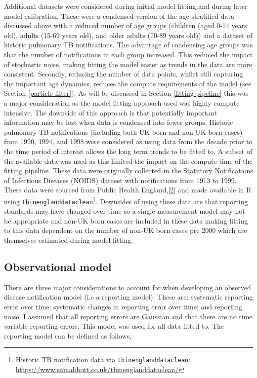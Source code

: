 \documentclass[11pt,twoside]{bristolthesis}
\begin{document}
  Additional datasets were considered during initial model fitting and during later model calibration. These were a condensed version of the age stratified data discussed above with a reduced number of age groups (children (aged 0-14 years old), adults (15-69 years old), and older adults (70-89 years old)) and a dataset of historic pulmonary TB notifications. The advantage of condensing age groups was that the number of notifications in each group increased. This reduced the impact of stochastic noise, making fitting the model easier as trends in the data are more consistent. Secondly, reducing the number of data points, whilst still capturing the important age dynamics, reduces the compute requirements of the model (see Section \ref{particle-filter}). As will be discussed in Section \ref{fitting-pipeline} this was a major consideration as the model fitting approach used was highly compute intensive. The downside of this approach is that potentially important information may be lost when data is condensed into fewer groups. Historic pulmonary TB notifications (including both UK born and non-UK born cases) from 1990, 1994, and 1998 were considered as using data from the decade prior to the time period of interest allows the long term trends to be fitted to. A subset of the available data was used as this limited the impact on the compute time of the fitting pipeline. These data were originally collected in the Statutory Notifications of Infectious Diseases (NOIDS) dataset with notifications from 1913 to 1999. These data were sourced from Public Health England,{[}\protect\hyperlink{ref-PHE2017}{2}{]} and made available in R using \texttt{tbinenglanddataclean}\footnote{Historic TB notification data via \texttt{tbinenglanddataclean}: \url{https://www.samabbott.co.uk/tbinenglanddataclean/}}. Downsides of using these data are that reporting standards may have changed over time so a single measurement model may not be appropriate and non-UK born cases are included in these data making fitting to this data dependent on the number of non-UK born cases pre 2000 which are themselves estimated during model fitting.
  
  \hypertarget{observational-model}{%
  \subsection{Observational model}\label{observational-model}}
  
  There are three major considerations to account for when developing an observed disease notification model (i.e a reporting model). These are: systematic reporting error over time; systematic changes in reporting error over time; and reporting noise. I assumed that all reporting errors are Gaussian and that there are no time variable reporting errors. This model was used for all data fitted to. The reporting model can be defined as follows,
  
\end{document}
